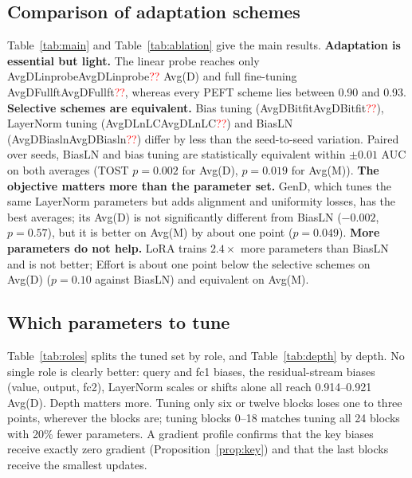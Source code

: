 \documentclass[fonts]{icst}
\newcommand{\num}[1]{\ifcsname #1\endcsname\csname #1\endcsname\else\textcolor{red}{??}\fi}
\begin{document}
\subsection{Comparison of adaptation schemes}
Table~\ref{tab:main} and Table~\ref{tab:ablation} give the main results.
\textbf{Adaptation is essential but light.} The linear probe reaches only \num{AvgDLinprobe} Avg(D) and full fine-tuning \num{AvgDFullft}, whereas every PEFT scheme lies between 0.90 and 0.93.
\textbf{Selective schemes are equivalent.} Bias tuning (\num{AvgDBitfit}), LayerNorm tuning (\num{AvgDLnLC}) and BiasLN (\num{AvgDBiasln}) differ by less than the seed-to-seed variation. Paired over seeds, BiasLN and bias tuning are statistically equivalent within $\pm0.01$ AUC on both averages (TOST $p=0.002$ for Avg(D), $p=0.019$ for Avg(M)).
\textbf{The objective matters more than the parameter set.} GenD, which tunes the same LayerNorm parameters but adds alignment and uniformity losses, has the best averages; its Avg(D) is not significantly different from BiasLN ($-0.002$, $p=0.57$), but it is better on Avg(M) by about one point ($p=0.049$).
\textbf{More parameters do not help.} LoRA trains $2.4\times$ more parameters than BiasLN and is not better; Effort is about one point below the selective schemes on Avg(D) ($p=0.10$ against BiasLN) and equivalent on Avg(M).

\subsection{Which parameters to tune}
Table~\ref{tab:roles} splits the tuned set by role, and Table~\ref{tab:depth} by depth. No single role is clearly better: query and fc1 biases, the residual-stream biases (value, output, fc2), LayerNorm scales or shifts alone all reach 0.914--0.921 Avg(D). Depth matters more. Tuning only six or twelve blocks loses one to three points, wherever the blocks are; tuning blocks 0--18 matches tuning all 24 blocks with 20\% fewer parameters. A gradient profile confirms that the key biases receive exactly zero gradient (Proposition~\ref{prop:key}) and that the last blocks receive the smallest updates.

\begin{table}[!t]
\centering
\caption{Tuned subset inside BiasLN ($L_2$ normalization, cross-entropy). Video AUC, mean $\pm$ std over $n$ seeds.}
\label{tab:roles}
\resizebox{\columnwidth}{!}{}
\end{table}
\end{document}
